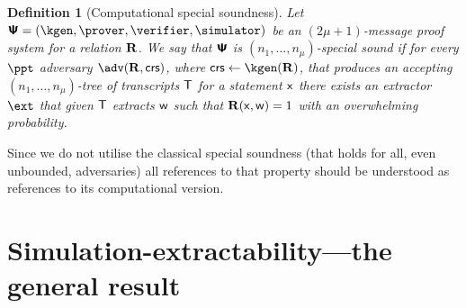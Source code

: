 \let\accentvec\vec \documentclass[runningheads]{llncs}
\newtheorem{definition}[theorem]{Definition}
\begin{document}
\begin{definition}[Computational special soundness]
  Let $\proofsystem = (\kgen, \prover, \verifier, \simulator)$ be an $(2 \mu +
  1)$-message proof system for a relation $\mathbf{R}$. We say that $\bm{\mathsf{\Psi}}$ is
  $(n_1, \ldots, n_\mu)$-\emph{special sound} if for every $\ppt$ adversary
  $\adv(\REL, \crs)$, where $\crs \gets \kgen(\REL)$, that produces an accepting
  $(n_1, \ldots, n_\mu)$-tree of transcripts $\mathsf{T}$ for a statement $\mathsf{x}$
  there exists an extractor $\ext$ that given $\mathsf{T}$ extracts $\mathsf{w}$ such that
  $\mathbf{R}(\mathsf{x}, \mathsf{w}) = 1$ with an overwhelming probability.
\end{definition}

Since we do not utilise the classical special soundness (that holds for all, even unbounded, adversaries) all references to that property should be understood as references to its computational version.

\section{Simulation-extractability---the general result}
\end{document}
